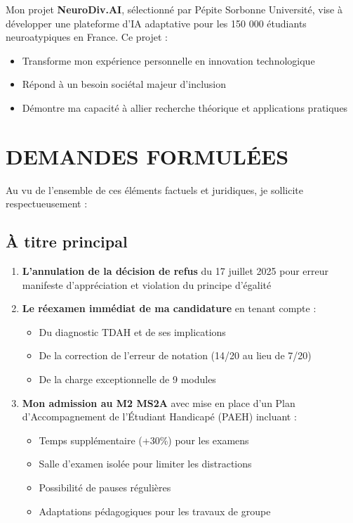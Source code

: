 \documentclass[12pt,french,a4paper]{article}
\begin{document}
Mon projet \textbf{NeuroDiv.AI}, sélectionné par Pépite Sorbonne Université, vise à développer une plateforme d'IA adaptative pour les 150 000 étudiants neuroatypiques en France. Ce projet :
\begin{itemize}
\item Transforme mon expérience personnelle en innovation technologique
\item Répond à un besoin sociétal majeur d'inclusion
\item Démontre ma capacité à allier recherche théorique et applications pratiques
\end{itemize}

\section{DEMANDES FORMULÉES}

Au vu de l'ensemble de ces éléments factuels et juridiques, je sollicite respectueusement :

\subsection{À titre principal}

\begin{enumerate}
\item \textbf{L'annulation de la décision de refus} du 17 juillet 2025 pour erreur manifeste d'appréciation et violation du principe d'égalité
\item \textbf{Le réexamen immédiat de ma candidature} en tenant compte :
   \begin{itemize}
   \item Du diagnostic TDAH et de ses implications
   \item De la correction de l'erreur de notation (14/20 au lieu de 7/20)
   \item De la charge exceptionnelle de 9 modules
   \end{itemize}
\item \textbf{Mon admission au M2 MS2A} avec mise en place d'un Plan d'Accompagnement de l'Étudiant Handicapé (PAEH) incluant :
   \begin{itemize}
   \item Temps supplémentaire (+30\%) pour les examens
   \item Salle d'examen isolée pour limiter les distractions
   \item Possibilité de pauses régulières
   \item Adaptations pédagogiques pour les travaux de groupe
   \end{itemize}
\end{enumerate}
\end{document}
